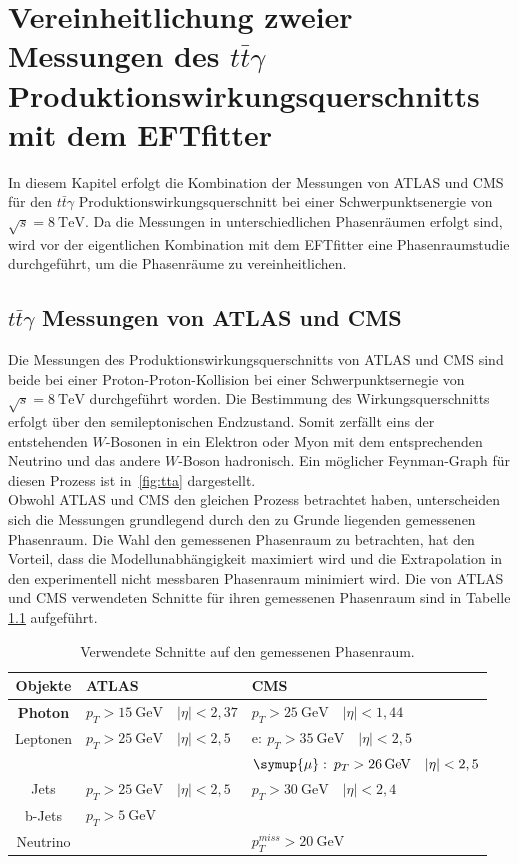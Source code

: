 \chapter{Vereinheitlichung zweier Messungen des \texorpdfstring {$t\bar{t}\gamma$}{math} Produktionswirkungsquerschnitts mit dem EFTfitter}%
In diesem Kapitel erfolgt die Kombination der Messungen von ATLAS und CMS für den $t\bar{t}\gamma$ Produktionswirkungsquerschnitt bei einer Schwerpunktsenergie von $\sqrt{s} = \SI{8}{\tera\electronvolt}$. Da die Messungen in unterschiedlichen Phasenräumen erfolgt sind, wird vor der eigentlichen Kombination mit dem EFTfitter eine Phasenraumstudie durchgeführt, um die Phasenräume zu vereinheitlichen.

\section{\texorpdfstring {$t\bar{t}\gamma$}{math} Messungen von ATLAS und CMS}%
\label{kap:messung}
Die Messungen des Produktionswirkungsquerschnitts von ATLAS\cite{Aaboud:2017era} und CMS\cite{Sirunyan:2017iyh} sind beide bei einer Proton-Proton-Kollision bei einer Schwerpunktsernegie von $\sqrt{s}=\SI{8}{\tera\electronvolt}$ durchgeführt worden. Die Bestimmung des Wirkungsquerschnitts erfolgt über den semileptonischen Endzustand. Somit zerfällt eins der entstehenden $W$-Bosonen in ein Elektron oder Myon mit dem entsprechenden Neutrino und das andere $W$-Boson hadronisch. Ein möglicher Feynman-Graph für diesen Prozess ist in~\ref{fig:tta} dargestellt.\\
Obwohl ATLAS und CMS den gleichen Prozess betrachtet haben, unterscheiden sich die Messungen grundlegend durch den zu Grunde liegenden gemessenen Phasenraum. Die Wahl den gemessenen Phasenraum zu betrachten, hat den Vorteil, dass die Modellunabhängigkeit maximiert wird und die Extrapolation in den experimentell nicht messbaren Phasenraum minimiert wird. Die von ATLAS und CMS verwendeten Schnitte für ihren gemessenen Phasenraum sind in Tabelle \ref{tab:cut}
aufgeführt.\\
%
 \begin{table}[H]
     \centering
    \begin{tabular}{c|l|l}
      Objekte & ATLAS & CMS \\
      \hline
      \textbf{Photon} & $p_T > \SI{15}{\giga\electronvolt}\quad |\eta| < 2,37$ & $p_T > \SI{25}{\giga\electronvolt}\quad |\eta| < 1,44$\\
      Leptonen & $p_T > \SI{25}{\giga\electronvolt}\quad |\eta| < 2,5$ & $\text{e}:\: p_T > \SI{35}{\giga\electronvolt}\quad |\eta| < 2,5$ \\
      {} & {} & $\symup{\mu}:\: p_T > \SI{26}{\giga\electronvolt}\quad |\eta| < 2,5$\\
      Jets & $p_T > \SI{25}{\giga\electronvolt}\quad |\eta| < 2,5$ & $p_T > \SI{30}{\giga\electronvolt}\quad |\eta| < 2,4$\\
      b-Jets & $p_T > \SI{5}{\giga\electronvolt}$ &  \\
      Neutrino &  & $p_T^{miss} > \SI{20}{\giga\electronvolt}$
    \end{tabular}
    \caption{Verwendete Schnitte auf den gemessenen Phasenraum.}
    \label{tab:cut}
 \end{table}
